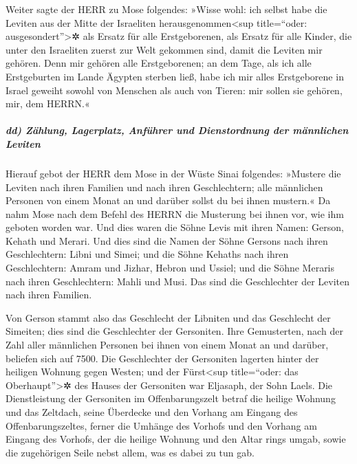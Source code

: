 Weiter sagte der HERR zu Mose folgendes:
»Wisse wohl: ich selbst habe die Leviten aus der Mitte
der Israeliten herausgenommen\textless sup title=``oder:
ausgesondert''\textgreater✲ als Ersatz für alle Erstgeborenen, als
Ersatz für alle Kinder, die unter den Israeliten zuerst zur Welt
gekommen sind, damit die Leviten mir gehören. Denn mir
gehören alle Erstgeborenen; an dem Tage, als ich alle Erstgeburten im
Lande Ägypten sterben ließ, habe ich mir alles Erstgeborene in Israel
geweiht sowohl von Menschen als auch von Tieren: mir sollen sie gehören,
mir, dem HERRN.«

\hypertarget{dd-zuxe4hlung-lagerplatz-anfuxfchrer-und-dienstordnung-der-muxe4nnlichen-leviten}{%
\subparagraph{dd) Zählung, Lagerplatz, Anführer und Dienstordnung der
männlichen
Leviten}\label{dd-zuxe4hlung-lagerplatz-anfuxfchrer-und-dienstordnung-der-muxe4nnlichen-leviten}}

Hierauf gebot der HERR dem Mose in der Wüste Sinai
folgendes: »Mustere die Leviten nach ihren Familien und
nach ihren Geschlechtern; alle männlichen Personen von einem Monat an
und darüber sollst du bei ihnen mustern.« Da nahm Mose
nach dem Befehl des HERRN die Musterung bei ihnen vor, wie ihm geboten
worden war. Und dies waren die Söhne Levis mit ihren
Namen: Gerson, Kehath und Merari. Und dies sind die Namen
der Söhne Gersons nach ihren Geschlechtern: Libni und Simei;
und die Söhne Kehaths nach ihren Geschlechtern: Amram und
Jizhar, Hebron und Ussiel; und die Söhne Meraris nach
ihren Geschlechtern: Mahli und Musi. Das sind die Geschlechter der
Leviten nach ihren Familien.

Von Gerson stammt also das Geschlecht der Libniten und
das Geschlecht der Simeiten; dies sind die Geschlechter der Gersoniten.
Ihre Gemusterten, nach der Zahl aller männlichen Personen
bei ihnen von einem Monat an und darüber, beliefen sich auf 7500.
Die Geschlechter der Gersoniten lagerten hinter der
heiligen Wohnung gegen Westen; und der Fürst\textless sup
title=``oder: das Oberhaupt''\textgreater✲ des Hauses der Gersoniten war
Eljasaph, der Sohn Laels. Die Dienstleistung der
Gersoniten im Offenbarungszelt betraf die heilige Wohnung und das
Zeltdach, seine Überdecke und den Vorhang am Eingang des
Offenbarungszeltes, ferner die Umhänge des Vorhofs und
den Vorhang am Eingang des Vorhofs, der die heilige Wohnung und den
Altar rings umgab, sowie die zugehörigen Seile nebst allem, was es dabei
zu tun gab.

